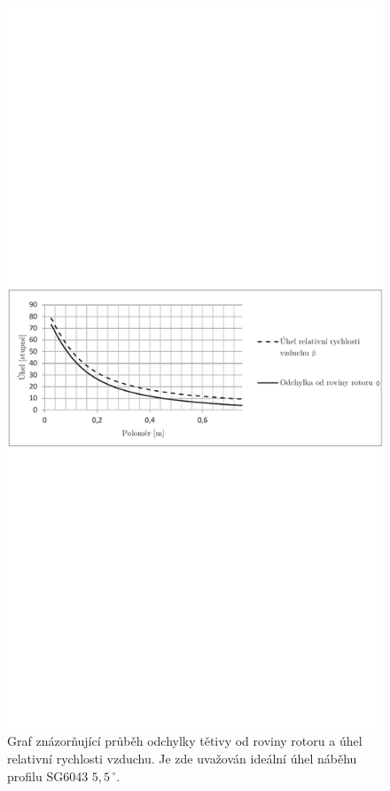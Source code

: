 	\begin{figure}[H]
				\centering
					\includegraphics[]{obrazky/grafy/nabehp}
				\caption{Graf znázorňující průběh odchylky tětivy od roviny rotoru a úhel relativní rychlosti vzduchu. Je zde uvažován ideální úhel náběhu profilu SG6043 $5,5\,^{\circ}$.}
				\label{graf.nabeh1}
	\end{figure}
	
